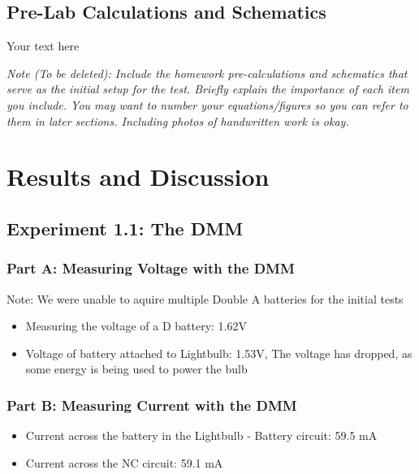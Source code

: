 \documentclass[10pt]{article}
\begin{document}
	\subsection{Pre-Lab Calculations and Schematics}
	
	Your text here
	
	\medskip
	
	\textit{Note (To be deleted): Include the homework pre-calculations and schematics that serve as the initial setup for the test. Briefly explain the importance of each item you include. You may want to number your equations/figures so you can refer to them in later sections. Including photos of handwritten work is okay.}
	
	\section{Results and Discussion}
	
	\subsection{Experiment 1.1: The DMM}
	\subsubsection{Part A: Measuring Voltage with the DMM}

	Note: We were unable to aquire multiple Double A batteries for the initial tests
	\begin{itemize}
	
	\item Measuring the voltage of a D battery: 1.62V
	\item Voltage of battery attached to Lightbulb: 1.53V, The voltage has dropped, as some energy is being used to power the bulb
	\end{itemize}

	\subsubsection{Part B: Measuring Current with the DMM}
	\begin{itemize}
	\item Current across the battery in the Lightbulb - Battery circuit: 59.5 mA
	\item Current across the NC circuit: 59.1 mA
	\end{itemize}
\end{document}
